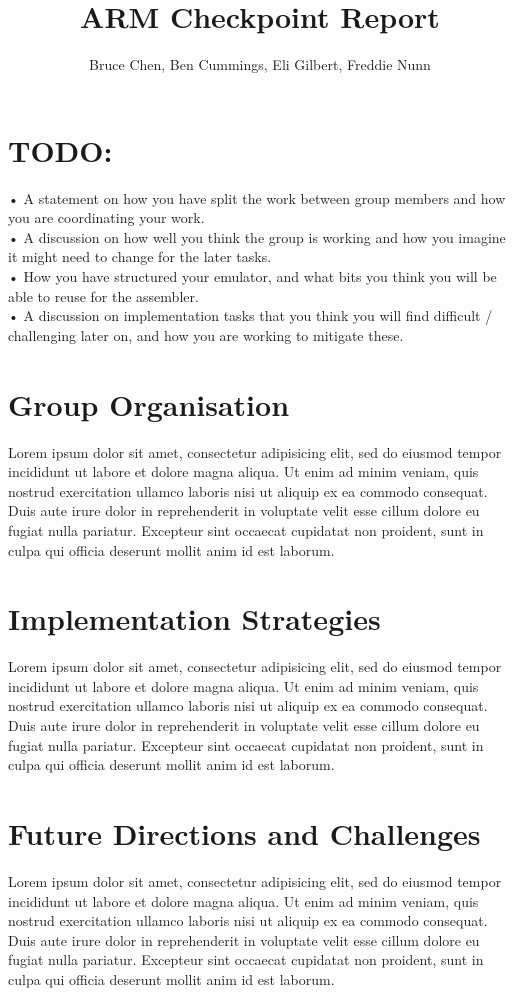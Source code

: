 \documentclass[11pt]{article}
\begin{document}
\title{ARM Checkpoint Report}
\author{Bruce Chen, Ben Cummings, Eli Gilbert, Freddie Nunn}

\maketitle

\section{TODO:}

• A statement on how you have split the work between group members and how you are coordinating
your work.
\\• A discussion on how well you think the group is working and how you imagine it might need to
change for the later tasks.
\\• How you have structured your emulator, and what bits you think you will be able to reuse for the
assembler.
\\• A discussion on implementation tasks that you think you will find difficult / challenging later on,
and how you are working to mitigate these.

\section{Group Organisation}

Lorem ipsum dolor sit amet, consectetur adipisicing elit, sed do eiusmod tempor
incididunt ut labore et dolore magna aliqua. Ut enim ad minim veniam, quis
nostrud exercitation ullamco laboris nisi ut aliquip ex ea commodo consequat.
Duis aute irure dolor in reprehenderit in voluptate velit esse cillum dolore eu
fugiat nulla pariatur. Excepteur sint occaecat cupidatat non proident, sunt in
culpa qui officia deserunt mollit anim id est laborum.

\section{Implementation Strategies}

Lorem ipsum dolor sit amet, consectetur adipisicing elit, sed do eiusmod tempor
incididunt ut labore et dolore magna aliqua. Ut enim ad minim veniam, quis
nostrud exercitation ullamco laboris nisi ut aliquip ex ea commodo consequat.
Duis aute irure dolor in reprehenderit in voluptate velit esse cillum dolore eu
fugiat nulla pariatur. Excepteur sint occaecat cupidatat non proident, sunt in
culpa qui officia deserunt mollit anim id est laborum.

\section{Future Directions and Challenges}

Lorem ipsum dolor sit amet, consectetur adipisicing elit, sed do eiusmod tempor
incididunt ut labore et dolore magna aliqua. Ut enim ad minim veniam, quis
nostrud exercitation ullamco laboris nisi ut aliquip ex ea commodo consequat.
Duis aute irure dolor in reprehenderit in voluptate velit esse cillum dolore eu
fugiat nulla pariatur. Excepteur sint occaecat cupidatat non proident, sunt in
culpa qui officia deserunt mollit anim id est laborum.
\end{document}
